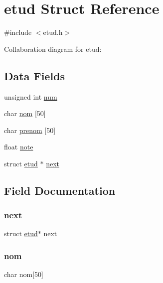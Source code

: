 \hypertarget{structetud}{}\section{etud Struct Reference}
\label{structetud}


{\ttfamily \#include $<$etud.\+h$>$}



Collaboration diagram for etud\+:
\subsection*{Data Fields}
\begin{DoxyCompactItemize}
\item 
unsigned int \hyperlink{structetud_a41ddefd3473727cad32a9767c10faed8}{num}
\item 
char \hyperlink{structetud_aee34926ea76003bbcc975fe153d8f236}{nom} \mbox{[}50\mbox{]}
\item 
char \hyperlink{structetud_acf879196fb0116270795a768b12baccf}{prenom} \mbox{[}50\mbox{]}
\item 
float \hyperlink{structetud_a6237b049d81028868055c48398511caf}{note}
\item 
struct \hyperlink{structetud}{etud} $\ast$ \hyperlink{structetud_a976739e6ba7a7db9c1d991ae5ed5a045}{next}
\end{DoxyCompactItemize}


\subsection{Field Documentation}
\mbox{\label{structetud_a976739e6ba7a7db9c1d991ae5ed5a045}} 
\subsubsection{\texorpdfstring{next}{next}}
{\footnotesize\ttfamily struct \hyperlink{structetud}{etud}$\ast$ next}

\mbox{\label{structetud_aee34926ea76003bbcc975fe153d8f236}} 
\subsubsection{\texorpdfstring{nom}{nom}}
{\footnotesize\ttfamily char nom\mbox{[}50\mbox{]}}

